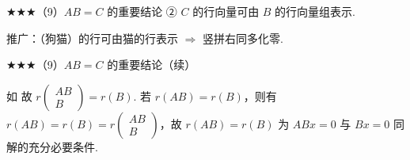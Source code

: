 \begin{fcard}{★★★（9）$AB=C$ 的重要结论}
② $C$ 的行向量可由 $B$ 的行向量组表示.

推广：（狗猫）的行可由猫的行表示 $\Rightarrow$ 竖拼右同多化零.
\end{fcard}

\begin{fcard}{★★★（9）$AB=C$ 的重要结论（续）}


如
故 $r\begin{pmatrix}AB\\ B\end{pmatrix}=r(B)$. 若 $r(AB)=r(B)$，则有 $r(AB)=r(B)=r\begin{pmatrix}AB\\ B\end{pmatrix}$，故 $r(AB)=r(B)$ 为 $ABx=0$ 与 $Bx=0$ 同解的充分必要条件.
\end{fcard}

